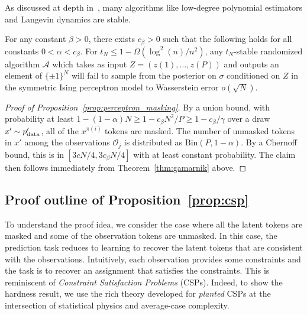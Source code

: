 As discussed at depth in~\cite{gamarnik2021overlap}, many algorithms like low-degree polynomial estimators and Langevin dynamics are stable. 

\begin{theorem}\label{thm:gamarnik}
    For any constant $\beta > 0$, there exists $c_\beta > 0$ such that the following holds for all constants $0 < \alpha < c_\beta$. For $t_N \le 1 - \Omega(\log^2(n) / n^2)$, any $t_N$-stable randomized algorithm $\mathcal{A}$ which takes as input $Z = (z{(1)},\ldots,z{(P)})$ and outputs an element of $\{\pm 1\}^N$ will fail to sample from the posterior on $\sigma$ conditioned on $Z$ in the symmetric Ising perceptron model to Wasserstein error $o(\sqrt{N})$.
\end{theorem}


\begin{proof}[Proof of Proposition~\ref{prop:perceptron_masking}]
    By a union bound, with probability at least $1 - (1 - \alpha) N \ge 1 - c_\beta N^2/P \ge 1 - c_\beta /\gamma$ over a draw $x' \sim p'_{\rm data}$, all of the $x^{\pi(i)}$ tokens are masked. The number of unmasked tokens in $x'$ among the observations $\mathcal{O}_j$ is distributed as $\mathrm{Bin}(P, 1 - \alpha)$. By a Chernoff bound, this is in $[3cN/4, 3c_\beta N/4]$ with at least constant probability. The claim then follows immediately from Theorem~\ref{thm:gamarnik} above. 
\end{proof}

\subsection{Proof outline of Proposition~\ref{prop:csp}} \label{appendix:pf_outline_hardness}
 To understand the proof idea, we consider the case where all the latent tokens are masked and some of the observation tokens are unmasked. In this case, the prediction task reduces to learning to recover the latent tokens that are consistent with the observations. Intuitively, each observation provides some constraints and the task is to recover an assignment that satisfies the constraints. This is reminiscent of \emph{Constraint Satisfaction Problems} (CSPs). Indeed, to show the hardness result, we use the rich theory developed for \emph{planted} CSPs at the intersection of statistical physics and average-case complexity. 

